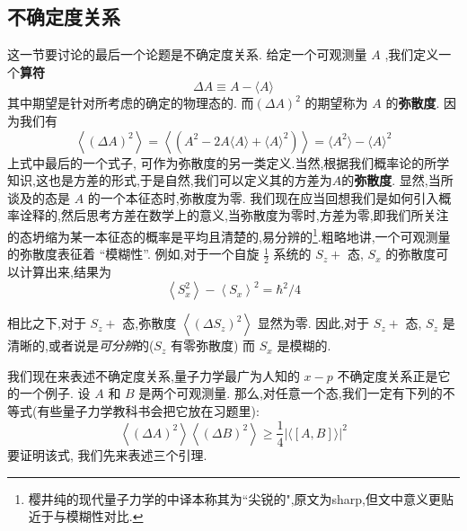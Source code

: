 	\subsection{不确定度关系}
	这一节要讨论的最后一个论题是不确定度关系. 给定一个可观测量 $A$ ,我们定义一个\textbf{算符}
	\begin{equation}
		{\Delta A} \equiv A - \langle A\rangle
	\end{equation}
	其中期望是针对所考虑的确定的物理态的. 而${\left( \Delta A\right) }^{2}$ 的期望称为 $A$ 的\textbf{弥散度}. 因为我们有
	\begin{equation}
		\left\langle {\left( \Delta A\right) }^{2}\right\rangle = \left\langle \left( {{A}^{2} - {2A}\langle A\rangle +\langle A{\rangle }^{2}}\right) \right\rangle = \langle {A}^{2}\rangle - \langle A{\rangle }^{2}
	\end{equation}
	上式中最后的一个式子, 可作为弥散度的另一类定义.当然,根据我们概率论的所学知识,这也是方差的形式,于是自然,我们可以定义其的方差为$A$的\textbf{弥散度}. 显然,当所谈及的态是 $A$ 的一个本征态时,弥散度为零. 我们现在应当回想我们是如何引入概率诠释的,然后思考方差在数学上的意义,当弥散度为零时,方差为零,即我们所关注的态坍缩为某一本征态的概率是平均且清楚的,易分辨的\footnote{樱井纯的现代量子力学的中译本称其为``尖锐的",原文为sharp,但文中意义更贴近于与模糊性对比.}.粗略地讲,一个可观测量的弥散度表征着 “模糊性”. 例如,对于一个自旋 $\frac{1}{2}$ 系统的 ${S}_{z} +$ 态, ${S}_{x}$ 的弥散度可以计算出来,结果为
	\begin{equation}
		\left\langle {S}_{x}^{2}\right\rangle - {\left\langle {S}_{x}\right\rangle }^{2} = {\hbar }^{2}/4
	\end{equation}
	
	相比之下,对于 ${S}_{z} +$ 态,弥散度 $\left\langle {\left( \Delta {S}_{z}\right) }^{2}\right\rangle$ 显然为零. 因此,对于 ${S}_{z} +$ 态, ${S}_{z}$ 是清晰的,或者说是\textit{可分辨}的(${S}_{z}$ 有零弥散度) 而 ${S}_{x}$ 是模糊的.
	
	我们现在来表述不确定度关系,量子力学最广为人知的 $x - p$ 不确定度关系正是它的一个例子. 设 $A$ 和 $B$ 是两个可观测量. 那么,对任意一个态,我们一定有下列的不等式(有些量子力学教科书会把它放在习题里):
	\begin{equation}
		\left\langle {\left( \Delta A\right) }^{2}\right\rangle \left\langle {\left( \Delta B\right) }^{2}\right\rangle \geq \frac{1}{4}{\left| \langle \left\lbrack A, B\right\rbrack \rangle \right| }^{2}
	\end{equation}
	要证明该式, 我们先来表述三个引理.
	

